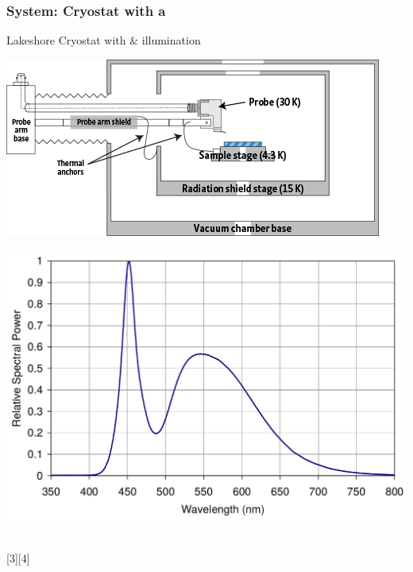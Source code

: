 \documentclass{beamer}
\begin{document}
\begin{frame}
\frametitle{ System: Cryostat with a \kp{}}
\begin{block}{Lakeshore Cryostat with \McA{} \kp{} \& \led{} illumination}
\centering
\begin{minipage}{0.45\linewidth}
\centering
	\includegraphics[width=1\linewidth]{./figs/pres/Config_TTPX}
\end{minipage}
\hfill
\begin{minipage}{0.45\linewidth}
\centering
	\includegraphics[width=1\linewidth]{./figs/pres/ledspec}
\end{minipage}\\
\hspace{0.25\linewidth}\textcolor{RUred}{[3]}\hfill\textcolor{RUred}{[4]}\hspace{0.2\linewidth}
\end{block}\end{frame}
\end{document}
